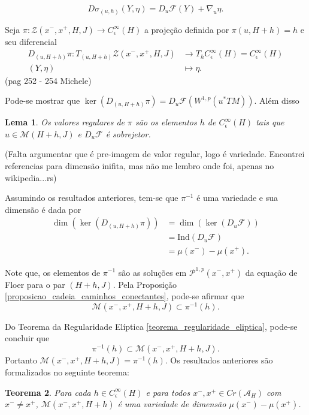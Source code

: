 \documentclass[12pt]{book}
\newtheorem{teorema}{Teorema}[section]
\newtheorem{lema}[teorema]{Lema}
\newcommand{\caminhosexponenciaisconectantes}[2]{\mathcal{P}^{1,p}(#1, #2)}
\newcommand{\caminhosexponenciaisconectantespadrao}{\caminhosexponenciaisconectantes{x^{-}}{x^{+}}}
\newcommand{\diferencialfloerponto}[1]{D_{#1}\operadorFloer}
\newcommand{\energiafinitaM}{\mathcal{M}}
\newcommand{\energiafinitaMconectanteHamiltoniana}{\energiafinitaM(x^{-}, x^{+},H+h,J)}
\newcommand{\espacosobolev}[1]{W^{1,p}(#1)}
\newcommand{\funcionalH}{\mathcal{A}_{H}}
\newcommand{\ind}{\text{Ind}}
\newcommand{\operadorFloer}{\mathcal{F}}
\newcommand{\orbitasConectantesZ}{\mathcal{Z}(x^{-}, x^{+},H, J)}
\newcommand{\perturbacaoHamiltoniana}[1]{C^{\infty}_{\epsilon}(#1)}
\newcommand{\pontoscriticos}[1]{\textit{Cr}(#1)}
\newcommand{\pullbackfibradotangente}[2]{#1^{*}T#2}
\newcommand{\pullbackfibradotangenteM}[1]{\pullbackfibradotangente{#1}{M}}
\newcommand{\aviso}[1]{{\color{violet}(#1)}}
\newcommand{\alerta}[1]{{\color{red}#1}}
\begin{document}
	$$
	D\sigma_{(u,h)}(Y,\eta) = \diferencialfloerponto{u}(Y)+\nabla_{u}\eta.
	$$
	
	Seja $\pi:\orbitasConectantesZ \to \perturbacaoHamiltoniana{H}$ a projeção definida por $\pi(u, H+h) = h$ e seu diferencial
	$$
	\begin{aligned}
	D_{(u,H+h)}\pi: T_{(u,H+h)}\orbitasConectantesZ 
	&\to T_{h}\perturbacaoHamiltoniana{H}=\perturbacaoHamiltoniana{H}
	\\
	(Y,\eta) &\mapsto \eta.
	\end{aligned}
	$$
	\aviso{pag 252 - 254 Michele}
	
	Pode-se mostrar que $
	\ker(D_{(u,H+h)}\pi)=\diferencialfloerponto{u}(\espacosobolev{\pullbackfibradotangenteM{u}})$. Além disso 
	\begin{lema}
		Os valores regulares de $\pi$ são os elementos $h$ de $\perturbacaoHamiltoniana{H}$ tais que $u\in \energiafinitaM(H+h, J)$ e $\diferencialfloerponto{u}$ é sobrejetor.
	\end{lema}

	\alerta{(Falta argumentar que é pre-imagem de valor regular, logo é variedade. Encontrei referencias para dimensão inifita, mas não me lembro onde foi, apenas no wikipedia...rs)}

	Assumindo os resultados anteriores, tem-se que $\pi^{-1}$ é uma variedade e sua dimensão é dada por
	$$
	\begin{aligned}
	\dim(\ker(D_{(u, H+h)}\pi)) &= \dim(\ker(\diferencialfloerponto{u}))
	\\
	&=\ind{(\diferencialfloerponto{u})}
	\\
	&=\mu(x^{-})-\mu(x^{+}).
	\end{aligned}
	$$
	
	Note que, os elementos de $\pi^{-1}$ são as soluções em $\caminhosexponenciaisconectantespadrao$ da equação de Floer para o par $(H+h, J)$. Pela Proposição \ref{proposicao_cadeia_caminhos_conectantes}, pode-se afirmar que 
	$$
	\energiafinitaMconectanteHamiltoniana \subset\pi^{-1}(h).
	$$
	
	Do Teorema da Regularidade Elíptica \ref{teorema_regularidade_eliptica}, pode-se concluir que 
	$$
	\pi^{-1}(h) \subset\energiafinitaMconectanteHamiltoniana.
	$$
	Portanto $\energiafinitaMconectanteHamiltoniana =\pi^{-1}(h)$. Os resultados anteriores são formalizados no seguinte teorema:
	
	\begin{teorema}
		Para cada $h \in \perturbacaoHamiltoniana{H}$ e para todos $x^{-}, x^{+}\in \pontoscriticos{\funcionalH}$ com $x^{-}\neq x^{+}$, $\energiafinitaM(x^{-}, x^{+}, H+h)$ é uma variedade de dimensão $\mu(x^{-})-\mu(x^{+})$.
	\end{teorema} 
	
\end{document}
